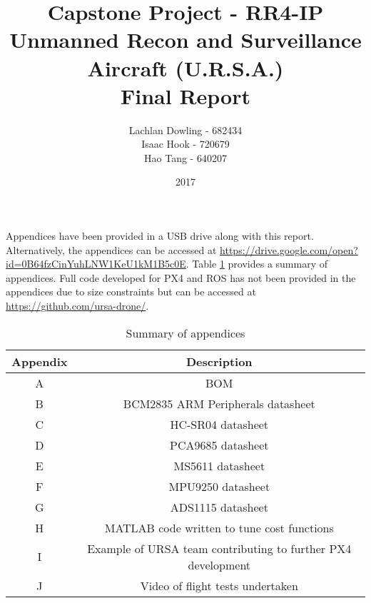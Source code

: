 \documentclass[12pt]{report}
\title{Capstone Project - RR4-IP \\Unmanned Recon and Surveillance Aircraft (U.R.S.A.) \\ \Huge Final Report}
\author{\large Lachlan Dowling - 682434 \\ Isaac Hook - 720679 \\ Hao Tang - 640207 }
\date{2017}
\begin{document}
\thispagestyle{empty}
    \maketitle
    \thispagestyle{empty}
    
    \newpage

    \clearpage
    \setcounter{page}{1}



\tableofcontents









{}


\appendix
\appendixpage
Appendices have been provided in a USB drive along with this report. Alternatively, the appendices can be accessed at \url{https://drive.google.com/open?id=0B64fzCinYuhLNW1KeU1kM1B5c0E}. Table \ref{tab:apptable} provides a summary of appendices. Full code developed for PX4 and ROS has not been provided in the appendices due to size constraints but can be accessed at \url{https://github.com/ursa-drone/}.

\begin{table}[H]
\centering
    \begin{tabular}{|c|c|}
        \hline
        Appendix & Description\\
        \hline
        A & BOM \\
        B & BCM2835 ARM Peripherals datasheet\\
        C & HC-SR04 datasheet\\
        D & PCA9685 datasheet\\
        E & MS5611 datasheet\\
        F & MPU9250 datasheet\\
        G & ADS1115 datasheet\\
        H & MATLAB code written to tune cost functions\\
        I & Example of URSA team contributing to further PX4 development\\
        J & Video of flight tests undertaken\\
        \hline
    \end{tabular}
\caption{Summary of appendices \label{tab:apptable}}
\end{table}
\end{document}
